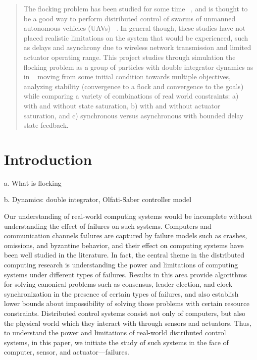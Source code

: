 \documentclass[10pt, conference, compsocconf]{IEEEtran}
\begin{document}
\begin{abstract}
The flocking problem has been studied for some time ~\cite{TODO}, and is thought to be a good way to perform distributed control of swarms of unmanned autonomous vehicles (UAVs) ~\cite{TODO}.  In general though, these studies have not placed realistic limitations on the system that would be experienced, such as delays and asynchrony due to wireless network transmission and limited actuator operating range.  This project studies through simulation the flocking problem as a group of particles with double integrator dynamics as in ~\cite{os2006} moving from some initial condition towards multiple objectives, analyzing stability (convergence to a flock and convergence to the goals) while comparing a variety of combinations of real world constraints: a) with and without state saturation, b) with and without actuator saturation, and c) synchronous versus asynchronous with bounded delay state feedback.
\end{abstract}

%


\def\titleName{{\title}}
\def\authorName{{Taylor Johnson}}


\section{Introduction}
\label{sec:intro}

a. What is flocking

b. Dynamics: double integrator, Olfati-Saber controller model


%
Our understanding of real-world computing systems would be incomplete
without understanding the effect of failures on such systems.
Computers and communication channels failures are captured by failure models 
such as crashes, omissions, and byzantine behavior, and their effect on 
computing systems have been well studied in the literature. 
%
In fact, the central theme in the distributed computing research 
is understanding the power and limitations of computing systems under 
different types of failures. 
%
Results in this area provide algorithms
for solving canonical problems 
such as consensus, leader election, and clock synchronization
in the presence of certain types of failures, and also establish 
lower bounds about impossibility of solving those 
problems with certain resource constraints. 
%
Distributed control systems consist not only of computers, 
but also the physical world which they interact with through 
sensors and actuators. 
%
Thus, to understand the power and limitations of 
real-world distributed control systems, in this paper, we 
initiate the study of such systems in the face of computer, sensor, and actuator---failures. 
\end{document}
